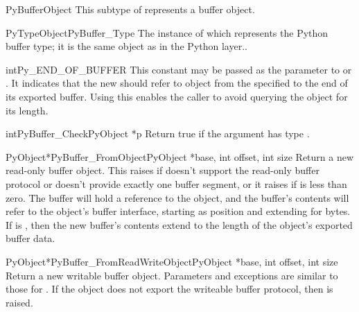 \documentclass{manual}
\begin{document}
\begin{ctypedesc}{PyBufferObject}
This subtype of  represents a buffer object.
\end{ctypedesc}

\begin{cvardesc}{PyTypeObject}{PyBuffer_Type}
The instance of  which represents the Python
buffer type; it is the same object as  in the
Python layer..
\end{cvardesc}

\begin{cvardesc}{int}{Py_END_OF_BUFFER}
This constant may be passed as the  parameter to
 or
. It indicates that the new
 should refer to  object from the
specified  to the end of its exported buffer. Using this
enables the caller to avoid querying the  object for its
length.
\end{cvardesc}

\begin{cfuncdesc}{int}{PyBuffer_Check}{PyObject *p}
Return true if the argument has type .
\end{cfuncdesc}

\begin{cfuncdesc}{PyObject*}{PyBuffer_FromObject}{PyObject *base,
                                                  int offset, int size}
Return a new read-only buffer object.  This raises
 if  doesn't support the read-only
buffer protocol or doesn't provide exactly one buffer segment, or it
raises  if  is less than zero. The
buffer will hold a reference to the  object, and the
buffer's contents will refer to the  object's buffer
interface, starting as position  and extending for
 bytes. If  is , then
the new buffer's contents extend to the length of the
 object's exported buffer data.
\end{cfuncdesc}

\begin{cfuncdesc}{PyObject*}{PyBuffer_FromReadWriteObject}{PyObject *base,
                                                           int offset,
                                                           int size}
Return a new writable buffer object.  Parameters and exceptions are
similar to those for .
If the  object does not export the writeable buffer
protocol, then  is raised.
\end{cfuncdesc}
\end{document}
